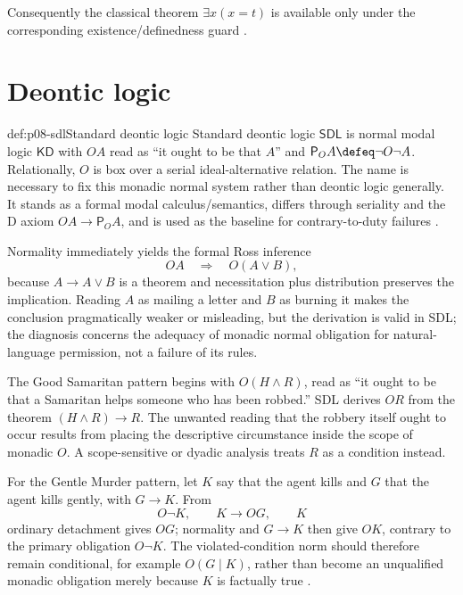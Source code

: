 Consequently the classical theorem \(\exists x(x=t)\) is available only under
the corresponding existence/definedness guard
\cite{GratzlPavlovicNolt2025}.

\section{Deontic logic}

\begin{hbdefinition}{def:p08-sdl}{Standard deontic logic}
Standard deontic logic \(\mathsf{SDL}\) is normal modal logic \(\mathsf{KD}\)
with \(O A\) read as ``it ought to be that \(A\)'' and
\(\mathsf P_O A\defeq\neg O\neg A\). Relationally, \(O\) is box over a serial
ideal-alternative relation. The name is necessary to fix this monadic normal
system rather than deontic logic generally. It stands as a formal modal
calculus/semantics, differs through seriality and the D axiom
\(OA\to\mathsf P_OA\), and is used as the baseline for contrary-to-duty failures
\cite{VonWright1951,McNamara2006}.
\end{hbdefinition}

Normality immediately yields the formal Ross inference
\[
 OA\quad\Longrightarrow\quad O(A\lor B),
\]
because \(A\to A\lor B\) is a theorem and necessitation plus distribution
preserves the implication.  Reading \(A\) as mailing a letter and \(B\) as
burning it makes the conclusion pragmatically weaker or misleading, but the
derivation is valid in SDL; the diagnosis concerns the adequacy of monadic
normal obligation for natural-language permission, not a failure of its rules.

The Good Samaritan pattern begins with \(O(H\land R)\), read as ``it ought to
be that a Samaritan helps someone who has been robbed.''  SDL derives \(OR\)
from the theorem \((H\land R)\to R\).  The unwanted reading that the robbery
itself ought to occur results from placing the descriptive circumstance inside
the scope of monadic \(O\).  A scope-sensitive or dyadic analysis treats
\(R\) as a condition instead.

For the Gentle Murder pattern, let \(K\) say that the agent kills and \(G\)
that the agent kills gently, with \(G\to K\).  From
\[
 O\neg K,\qquad K\to OG,\qquad K
\]
ordinary detachment gives \(OG\); normality and \(G\to K\) then give \(OK\),
contrary to the primary obligation \(O\neg K\).  The violated-condition norm
should therefore remain conditional, for example \(O(G\mid K)\), rather than
become an unqualified monadic obligation merely because \(K\) is factually
true \cite{Forrester1984}.

